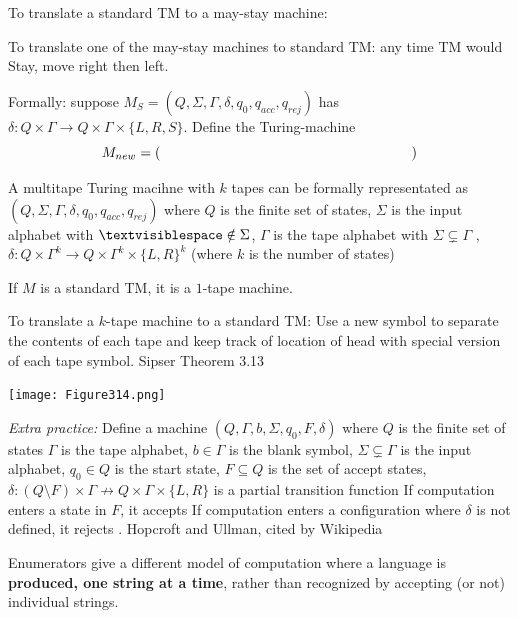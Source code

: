 \documentclass[12pt, oneside]{article}
\begin{document}
To translate a standard TM to a may-stay machine: 

\vspace{100pt}




To translate one  of the  may-stay machines to standard TM:
any time TM would Stay, move right  then  left.


Formally: suppose $M_S =  (Q, \Sigma, \Gamma, \delta, q_0, q_{acc}, q_{rej})$
has $\delta: Q \times \Gamma \to Q \times \Gamma \times \{L, R, S\}$. Define
the Turing-machine
\[
  M_{new} =  (\phantom{\hspace{2.5in}})
\]

\vfill

\newpage

\vfill


 A multitape Turing macihne with $k$ tapes
can be formally representated as 
$(Q, \Sigma,  \Gamma, \delta, q_0, q_{acc}, q_{rej})$ 
where $Q$ is the finite set of  states,
$\Sigma$ is the  input alphabet with  $\textvisiblespace \notin \Sigma$,
$\Gamma$  is the  tape alphabet with $\Sigma \subsetneq \Gamma$ ,
$\delta: Q\times \Gamma^k\to Q \times \Gamma^k \times \{L,R\}^k$ 
(where $k$ is  the number of  states)


If $M$ is a standard  TM, it is a $1$-tape machine.


To translate a $k$-tape machine  to  a standard TM:
Use a  new symbol to separate the contents of each tape
and keep track of location of  head with  special version of each
tape symbol. {\tiny Sipser Theorem 3.13} 

\texttt{[image: Figure314.png]}


{\it Extra practice:} 
Define a machine $(Q, \Gamma, b, \Sigma,  q_0, F, \delta)$
where $Q$ is the finite set  of  states
$\Gamma$  is the tape alphabet,
$b \in \Gamma$ is the blank symbol, 
$\Sigma \subsetneq \Gamma$ is the  input alphabet, 
$q_0 \in  Q$ is the start state, 
$F \subseteq Q$ is the set of accept states, 
$\delta: (Q \setminus F)  \times  \Gamma \not\to Q \times  \Gamma  \times \{L, R\}$
 is a partial transition function
If computation enters a state  in $F$, it  accepts 
If computation enters a configuration where
 $\delta$ is not defined, it  rejects . {\tiny Hopcroft and  Ullman, cited by  Wikipedia} 

\newpage
{} Enumerators give a different
model of computation where a language is {\bf produced, one string at a time},
rather than recognized by accepting (or not) individual strings.
\end{document}
